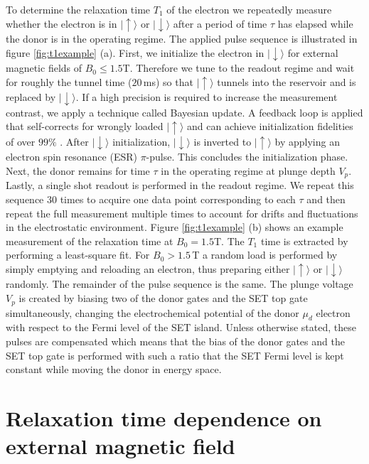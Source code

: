 \documentclass[%
 reprint,
 amsmath,amssymb,
 aps,
]{revtex4-1}
\newcommand {\ket} [1] {|{ #1 \rangle}}
\begin{document}
To determine the relaxation time $T_1$ of the electron we repeatedly measure whether the electron is in  $\ket{\uparrow}$ or $\ket{\downarrow}$ after a period of time $\tau$ has elapsed while the donor is in the operating regime. The applied pulse sequence is illustrated in figure \ref{fig:t1example} (a). First, we initialize the electron in $\ket{\downarrow}$ for external magnetic fields of $B_0\leq1.5$T. Therefore we tune to the readout regime and wait for roughly the tunnel time ($20\,$ms) so that $\ket{\uparrow}$ tunnels into the reservoir and is replaced by $\ket{\downarrow}$. If a high precision is required to increase the measurement contrast, we apply a technique called Bayesian update. A feedback loop is applied that self-corrects for wrongly loaded $\ket{\uparrow}$ and can achieve initialization fidelities of over $99\%$ \citep{Johnson2018}. After $\ket{\downarrow}$ initialization, $\ket{\downarrow}$ is inverted to $\ket{\uparrow}$ by applying an electron spin resonance (ESR) $\pi$-pulse. This concludes the initialization phase. Next, the donor remains for time $\tau$ in the operating regime at plunge depth $V_{p}$. Lastly, a single shot readout is performed in the readout regime. We repeat this sequence $30$ times to acquire one data point corresponding to each $\tau$ and then repeat the full measurement multiple times to account for drifts and fluctuations in the electrostatic environment. Figure \ref{fig:t1example} (b) shows an example measurement of the relaxation time at $B_0=1.5$T. The $T_1$ time is extracted by performing a least-square fit. For $B_0>1.5\,$T a random load is performed by simply emptying and reloading an electron, thus preparing either $\ket{\uparrow}$ or $\ket{\downarrow}$ randomly. The remainder of the pulse sequence is the same. The plunge voltage $V_p$ is created by biasing two of the donor gates and the SET top gate simultaneously, changing the electrochemical potential of the donor $\mu_d$ electron with respect to the Fermi level of the SET island. Unless otherwise stated, these pulses are compensated which means that the bias of the donor gates and the SET top gate is performed with such a ratio that the SET Fermi level is kept constant while moving the donor in energy space. 


\section{Relaxation time dependence on external magnetic field} \label{sec:extB}
\end{document}
